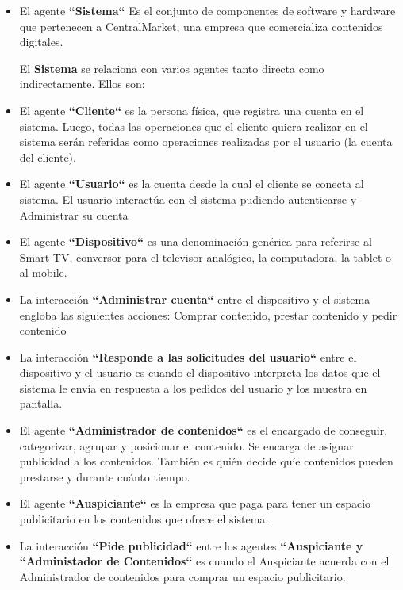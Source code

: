\documentclass[11pt, a4paper, spanish]{article}
\begin{document}
\begin{itemize}

	\item  {El agente \textbf{``Sistema``} Es el conjunto de componentes de software y hardware que pertenecen a CentralMarket, una empresa que 
	comercializa contenidos digitales.}

	El \textbf{Sistema} se relaciona con varios agentes tanto directa como indirectamente. Ellos son:

	\item El agente \textbf{``Cliente``} es la persona f\'isica, que registra una cuenta en el sistema. Luego, todas las operaciones que el cliente 
	quiera realizar en el sistema ser\'an referidas como operaciones realizadas por el usuario (la cuenta del cliente).

	\item El agente \textbf{``Usuario``} es la cuenta desde la cual el cliente se conecta al sistema. El usuario interact\'ua con el sistema 
	pudiendo autenticarse y Administrar su cuenta

	\item El agente \textbf{``Dispositivo``} es una denominaci\'on gen\'erica para referirse al Smart TV, conversor para el televisor anal\'ogico, 
	la computadora, la tablet o al mobile. 

	\item La interacci\'on \textbf{``Administrar cuenta``} entre el dispositivo y el sistema engloba las siguientes acciones: Comprar contenido, 
	prestar contenido y pedir contenido

	\item La interacci\'on \textbf{``Responde a las solicitudes del usuario``} entre el dispositivo y el usuario es cuando el dispositivo 
	interpreta los datos que el sistema le env\'ia en respuesta a los pedidos del usuario y los muestra en pantalla.	 
	   
	\item El agente \textbf{``Administrador de contenidos``} es el encargado de conseguir, categorizar, agrupar y posicionar el contenido. Se 
	encarga de asignar publicidad a los contenidos. Tambi\'en es qui\'en decide qu\'ie contenidos pueden prestarse y durante cu\'anto tiempo.

	\item El agente \textbf{``Auspiciante``} es la empresa que paga para tener un espacio publicitario en los contenidos que ofrece el sistema.

	\item La interacci\'on \textbf{``Pide publicidad``} entre los agentes \textbf{``Auspiciante y ``Administador de Contenidos``} es cuando el 
	Auspiciante acuerda con el Administrador de contenidos para comprar un espacio publicitario.
	  

\end{itemize}
\end{document}
